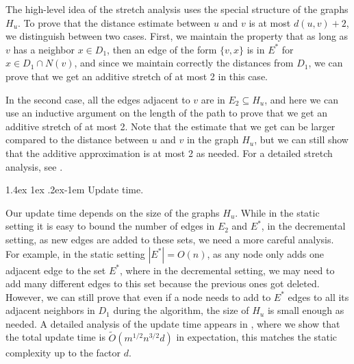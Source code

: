\documentclass[11pt]{article}
\makeatletter
\theoremstyle{definition}
\theoremstyle{remark}
\renewcommand{\paragraph}{%
  \@startsection{paragraph}{4}%
  {\z@}{1.4ex \@plus 1ex \@minus .2ex}{-1em}%
  {\normalfont\normalsize\bfseries}%
}
\makeatother
\begin{document}
The high-level idea of the stretch analysis uses the special structure of the graphs $H_u$. To prove that the distance estimate between $u$ and $v$ is at most $d(u,v)+2$, we distinguish between two cases. First, we maintain the property that as long as $v$ has a neighbor $x \in D_1$, then an edge of the form $\{v,x\}$ is in $E^*$ for $x \in D_1 \cap N(v)$, and since we maintain correctly the distances from $D_1$, we can prove that we get an additive stretch of at most 2 in this case. 

In the second case, all the edges adjacent to $v$ are in $E_2 \subseteq H_u$, and here we can use an inductive argument on the length of the path to prove that we get an additive stretch of at most 2. Note that the estimate that we get can be larger compared to the distance between $u$ and $v$ in the graph $H_u$, but we can still show that the additive approximation is at most 2 as needed. For a detailed stretch analysis, see .

\paragraph{Update time.}

Our update time depends on the size of the graphs $H_u$. While in the static setting it is easy to bound the number of edges in $E_2$ and $E^*$, in the decremental setting, as new edges are added to these sets, we need a more careful analysis. For example, in the static setting $|E^*|=O(n)$, as any node only adds one adjacent edge to the set $E^*$, where in the decremental setting, we may need to add many different edges to this set because the previous ones got deleted. However, we can still prove that even if a node needs to add to $E^*$ edges to all its adjacent neighbors in $D_1$ during the algorithm, the size of $H_u$ is small enough as needed. A detailed analysis of the update time appears in , where we show that the total update time is $\tilde{O}(m^{1/2}n^{3/2}d)$ in expectation, this matches the static complexity up to the factor $d$.
\end{document}
